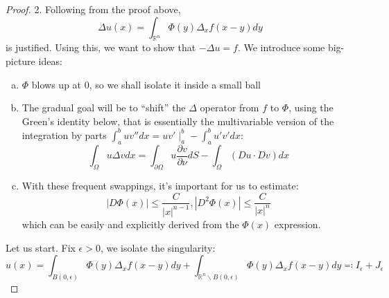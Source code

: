 \documentclass[openany, amssymb, psamsfonts]{amsart}
\theoremstyle{definition}
\numberwithin{equation}{section}
\newcommand{\bbr}{\mathbb{R}}
\begin{document}
\begin{proof}
    2. Following from the proof above, \[
    \Delta u(x) = \int_{\bbr^n} \Phi(y) \Delta_x f(x-y) dy
    \]
    is justified. Using this, we want to show that $- \Delta u = f$. We introduce some big-picture ideas:
    \begin{enumerate} [a)]
        \item $\Phi$ blows up at 0, so we shall isolate it inside a small ball
        \item The gradual goal will be to ``shift'' the $\Delta$ operator from $f$ to $\Phi$, using the Green's identity below, that is essentially the multivariable version of the integration by parts $\int_{a}^{b} u v'' dx = uv'\mid_a^b - \int_{a}^{b} u'v' dx$:
        \begin{equation} \label{greendudv}
            \int_{\Omega} u \Delta v dx = \int_{\partial \Omega} u\dfrac{\partial v}{\partial \nu}dS - \int_{\Omega} (Du \cdot Dv) dx 
        \end{equation}
        \item With these frequent swappings, it's important for us to estimate: \[
        |D\Phi (x)| \leq \dfrac{C}{|x|^{n-1}}, |D^2 \Phi(x)| \leq \dfrac{C}{|x|^n}
        \]
        which can be easily and explicitly derived from the $\Phi(x)$ expression.
    \end{enumerate}
    
    Let us start. Fix $\epsilon > 0$, we isolate the singularity:
    \[
    u(x) = \int_{B(0, \epsilon)} \Phi(y) \Delta_x f(x - y)dy + \int_{\bbr^n \backslash B(0, \epsilon)} \Phi(y) \Delta_x f(x - y)dy \eqqcolon I_\epsilon + J_\epsilon
    \]


\end{proof}
\end{document}
